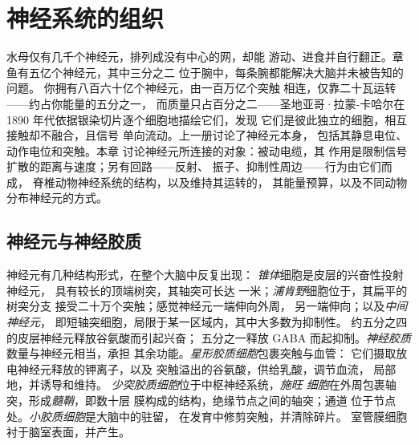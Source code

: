 \chapter{神经系统的组织}\label{ch:b3:nervous-systems}

水母仅有几千个神经元，排列成没有中心的网，却能
游动、进食并自行翻正。章鱼有五亿个神经元，其中三分之二
位于腕中，每条腕都能解决大脑并未被告知的问题。
你拥有八百六十亿个神经元，由一百万亿个突触
相连，仅靠二十瓦运转——约占你能量的五分之一，
而质量只占百分之二——圣地亚哥·拉蒙-卡哈尔在
1890 年代依据银染切片逐个细胞地描绘它们，发现
它们是彼此独立的细胞，相互接触却不融合，且信号
单向流动。上一册讨论了神经元本身，
包括其静息电位、动作电位和突触。本章
讨论神经元所连接的对象：被动电缆，其
作用是限制信号扩散的距离与速度；另有回路——反射、
振子、抑制性周边——行为由它们而成，
脊椎动物神经系统的结构，以及维持其运转的，
其能量预算，以及不同动物
分布神经元的方式。

\section{神经元与神经胶质}

\begin{definition}[神经系统的细胞]\label{def:b3:nervous-systems:cells}
神经元有几种结构形式，在整个大脑中反复出现：
\emph{锥体}细胞是皮层的兴奋性投射神经元，
具有较长的顶端树突，其轴突可长达
一米；\emph{浦肯野}细胞位于，其扁平的树突分支
接受二十万个突触；感觉神经元一端伸向外周，
另一端伸向；以及\emph{中间神经元}，
即短轴突细胞，局限于某一区域内，其中大多数为抑制性。
约五分之四的皮层神经元释放谷氨酸而引起兴奋；
五分之一释放 GABA 而起抑制。\emph{神经胶质}数量与神经元相当，承担
其余功能。\emph{星形胶质细胞}包裹突触与血管：
它们摄取放电神经元释放的钾离子，以及
突触溢出的谷氨酸，供给乳酸，调节血流，
局部地，并诱导和维持。
\emph{少突胶质细胞}位于中枢神经系统，\emph{施旺
细胞}在外周包裹轴突，形成\emph{髓鞘}，即数十层
膜构成的结构，绝缘节点之间的轴突；通道
位于节点处。\emph{小胶质细胞}是大脑中的驻留，
在发育中修剪突触，并清除碎片。
室管膜细胞衬于脑室表面，并产生。
\end{definition}

